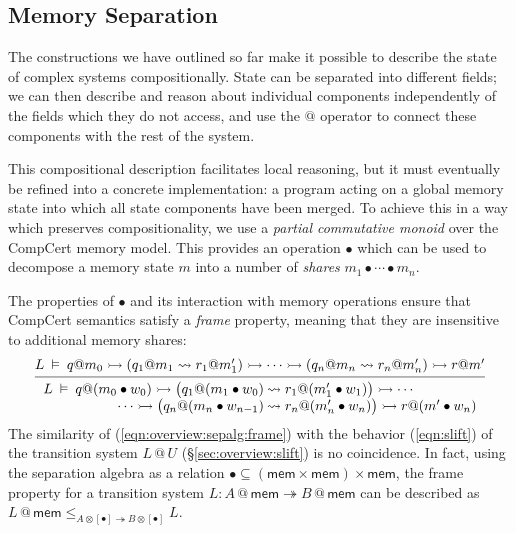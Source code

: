 \documentclass[acmsmall,screen,review,anonymous]{acmart}
\newcommand{\kw}[1]{\ensuremath{ \mathsf{#1} }}
\begin{document}
\subsection{Memory Separation} \label{sec:overview:sepalg} %

The constructions we have outlined so far
make it possible to describe
the state of complex systems compositionally.
State can be separated into different fields;
we can then describe and reason about individual components
independently of the fields which they do not access,
and use the $\mathbin@$ operator
to connect these components with the rest of the system.

This compositional description
facilitates local reasoning,
but it must eventually be refined into
a concrete implementation:
a program acting on a global memory state
into which all state components have been merged.
To achieve this in a way which preserves compositionality,
we use a \emph{partial commutative monoid}
over the CompCert memory model.
This provides an operation $\bullet$
which can be used to decompose a memory state $m$ into
a number of \emph{shares}
$
  m_1 \bullet \cdots \bullet m_n
$.

The properties of $\bullet$
and its interaction with memory operations
ensure that CompCert semantics satisfy
a \emph{frame} property,
meaning that they are insensitive to
additional memory shares:
\begin{equation} \label{eqn:overview:sepalg:frame}
  \begin{prooftree}
  \hypo{
  L \:\vDash\: q@m_0 \rightarrowtail
    (q_1@m_1 \leadsto r_1@m_1') \rightarrowtail
    \cdots \rightarrowtail
    (q_n@m_n \leadsto r_n@m_n') \rightarrowtail
    r@m'}
  \infer1{
   {\begin{array}{r@{\:}l}
    L \:\vDash\: q@(m_0 \bullet w_0) \rightarrowtail
      \big( q_1@(m_1 \bullet w_0) &\leadsto r_1@(m_1' \bullet w_1) \big) \rightarrowtail
      \cdots \\ \cdots \rightarrowtail
      \big( q_n@(m_n \bullet w_{n-1}) &\leadsto r_n@(m_n' \bullet w_n) \big) \rightarrowtail
      r@(m' \bullet w_n)
   \end{array}} }
  \end{prooftree}
\end{equation}
The similarity of (\ref{eqn:overview:sepalg:frame})
with the behavior (\ref{eqn:slift})
of the transition system $L \mathbin@ U$ (\S\ref{sec:overview:slift})
is no coincidence.
In fact,
using the separation algebra as a relation
${\bullet} \subseteq (\kw{mem} \times \kw{mem}) \times \kw{mem}$,
the frame property for a transition system
$L : A \mathbin@ \kw{mem} \twoheadrightarrow B \mathbin@ \kw{mem}$
can be described as
$
  L \mathbin@ \kw{mem}
  \le_{A \otimes [\bullet] \twoheadrightarrow B \otimes [\bullet]}
  L
$.
\end{document}
